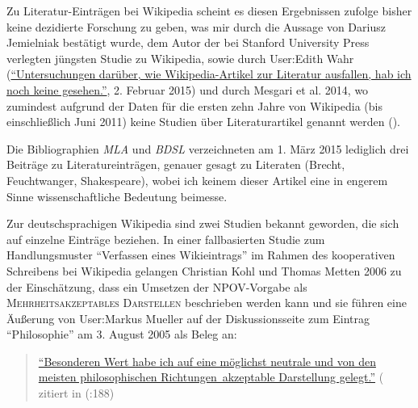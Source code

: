 \documentclass[fontsize=12pt]{scrartcl}
\begin{document}
Zu Li\-te\-ra\-tur-Eintr\"agen bei Wi\-ki\-pe\-dia scheint es diesen Ergebnissen zufolge bis\-her keine dezidierte For\-schung zu geben, was mir durch die Aussage von Dariusz Jemielniak best\"atigt wurde, dem Autor der bei Stanford University Press verlegten j\"ungsten Studie zu Wi\-ki\-pe\-dia, sowie durch \mbox{User}:Edith Wahr (\href{https://de.wikipedia.org/w/index.php?title=Benutzer_Diskussion:Edith_Wahr\&diff=138421804\&oldid=138421510}{"`Untersuchungen da\-r\"u\-ber, wie Wi\-ki\-pe\-dia-Artikel zur Li\-te\-ra\-tur ausfallen, hab ich noch keine gesehen."'}, 2. Februar 2015) und durch Mesgari et al. 2014, wo zumindest aufgrund der Daten f\"ur die ersten zehn Jahre von Wikipedia (bis einschlie{\ss}lich Juni 2011) keine Studien \"uber Li\-te\-ra\-tur\-artikel genannt werden (\cite{Mesgarietal2014}).

Die Bibliographien \textit{MLA} und \textit{BDSL} verzeichneten am 1. M\"arz 2015 lediglich drei Beitr\"age zu Li\-te\-ra\-tur\-eintr\"agen, genauer gesagt zu Literaten\textsuperscript{\tiny *} (Brecht, Feuchtwanger, Shakespeare), wobei ich keinem dieser Artikel eine in engerem Sinne wissenschaftliche Bedeutung beimesse.

Zur deutschspra\-chi\-gen Wi\-ki\-pe\-dia sind zwei Studien bekannt geworden, die sich auf einzelne Eintr\"age beziehen. In einer fallbasierten Studie zum Handlungsmuster "`Verfassen eines Wikieintrags"' im Rahmen des kooperativen Schrei\-bens bei Wi\-ki\-pe\-dia gelangen Christian Kohl und Thomas Metten 2006 zu der Einsch\"atzung, dass ein Umsetzen der NPOV-Vorgabe als \textsc{Mehrheitsakzep\-tables Dar\-stel\-len} beschrieben werden kann und sie f\"uhren eine \"Au{\ss}erung von \mbox{User}:Markus Mueller auf der Dis\-kus\-si\-onsseite zum Eintrag "`Philosophie"' am 3. August 2005 als Beleg an: 

\singlespacing
\begin{quote}
\href{https://de.wikipedia.org/w/index.php?title=Diskussion:Philosophie\&diff=next\&oldid=7928221}{"`Besonderen Wert habe ich auf eine m\"oglichst neutrale und von den meisten philosophischen \flq Richtungen\frq\, akzeptable Darstellung gelegt."'} (\cite{UserMarkusMueller2005} zitiert in (\cite{KohlMetten2006}:188)
\end{quote}
\onehalfspacing
\end{document}
